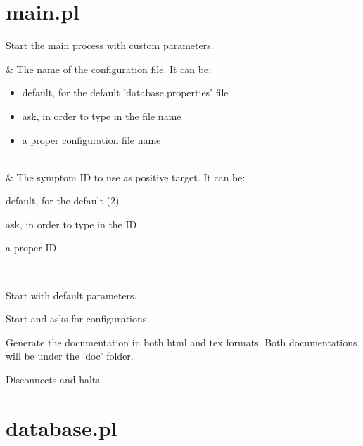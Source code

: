 \documentclass[11pt]{article}
\begin{document}



\section{main.pl}

\label{sec:main}

\begin{description}
Start the main process with custom parameters.

\begin{arguments}
 & The name of the configuration file. It can be:

\begin{itemize}
    \item default, for the default 'database.properties' file
    \item ask, in order to type in the file name
    \item a proper configuration file name
\end{itemize}

 \\
 & The symptom ID to use as positive target. It can be:

\begin{shortlist}
    \item default, for the default (2)
    \item ask, in order to type in the ID
    \item a proper ID
\end{shortlist}

 \\
\end{arguments}

Start  with default parameters.

Start  and asks for configurations.

Generate the documentation in both html and tex formats.
Both documentations will be under the 'doc' folder.

Disconnects and halts.
\end{description}

\section{database.pl}
\end{document}
